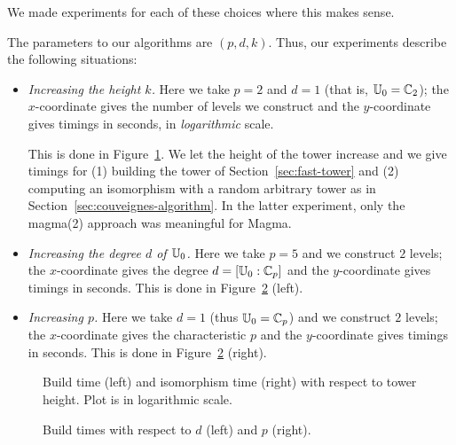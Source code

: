 \smallskip\noindent We made experiments for each of these choices where this makes sense.


\smallskip The parameters to our algorithms are
$(p,d,k)$. Thus, our experiments describe the following situations:

\begin{itemize}
\item {\em Increasing the height $k$.} Here we take $p=2$ and $d=1$ (that is,
  $\mathbb{U}_0=\mathbb{C}_2$); the $x$-coordinate gives the number of levels we
  construct and the $y$-coordinate gives timings in seconds, in {\em
    logarithmic} scale.

  This is done in Figure~\ref{fig:height}. We let the height of the
  tower increase and we give timings for (1) building the tower of
  Section~\ref{sec:fast-tower} and (2) computing an isomorphism with a
  random arbitrary tower as in Section~\ref{sec:couveignes-algorithm}.
  In the latter experiment, only the magma(2) approach was meaningful
  for Magma.

\smallskip

\item {\em Increasing the degree $d$ of $\mathbb{U}_0$.} Here we take $p=5$
  and we construct $2$ levels; the $x$-coordinate gives the degree $d
  = [\mathbb{U}_0:\mathbb{C}_p]$ and the $y$-coordinate gives timings in seconds.
  This is done in Figure~\ref{fig:p-d} (left).


  \smallskip

\item {\em Increasing $p$.} Here we take $d=1$ (thus $\mathbb{U}_0=\mathbb{C}_p$) and
  we construct $2$ levels; the $x$-coordinate gives the characteristic
  $p$ and the $y$-coordinate gives timings in seconds.  This is done
  in Figure~\ref{fig:p-d} (right).

\end{itemize}

\smallskip 

\begin{figure}
  \centering
  
  \caption{Build time (left) and isomorphism time (right) with respect to tower height. Plot is in logarithmic scale.}
  \label{fig:height}
\end{figure}

\begin{figure}
  \centering
  
  \caption{Build times with respect to $d$ (left) and $p$ (right).}
  \label{fig:p-d}
\end{figure}

